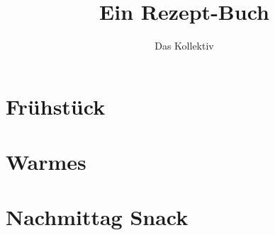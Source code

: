 \documentclass[a4paper, 11pt]{article}
\begin{document}
    \title{Ein Rezept-Buch}
    \author{Das Kollektiv}
    \maketitle
    \tableofcontents

    \vspace{5em}

    \section{Frühstück}

    
    
    
    \section{Warmes}
    
    

%    

    \section{Nachmittag Snack}
        


\end{document}
